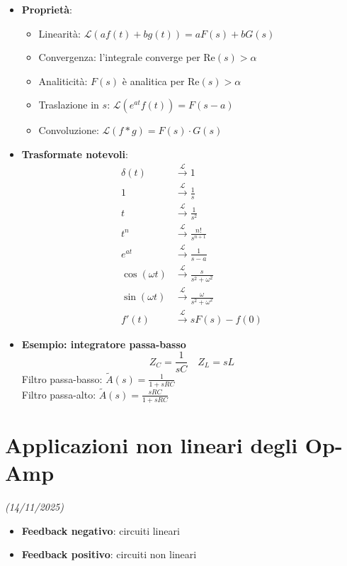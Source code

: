 \documentclass[11pt,a4paper]{report}
\begin{document}
\begin{itemize}
    \item \textbf{Proprietà}:
    \begin{itemize}
        \item Linearità: $\mathcal{L}(a f(t) + b g(t)) = a F(s) + b G(s)$
        \item Convergenza: l'integrale converge per $\text{Re}(s) > \alpha$
        \item Analiticità: $F(s)$ è analitica per $\text{Re}(s) > \alpha$
        \item Traslazione in $s$: $\mathcal{L}(e^{at} f(t)) = F(s-a)$
        \item Convoluzione: $\mathcal{L}(f * g) = F(s) \cdot G(s)$
    \end{itemize}
    \item \textbf{Trasformate notevoli}:
    \begin{align*}
        \delta(t) &\xrightarrow{\mathcal{L}} 1 \\
        1 &\xrightarrow{\mathcal{L}} \frac{1}{s} \\
        t &\xrightarrow{\mathcal{L}} \frac{1}{s^2} \\
        t^n &\xrightarrow{\mathcal{L}} \frac{n!}{s^{n+1}} \\
        e^{at} &\xrightarrow{\mathcal{L}} \frac{1}{s-a} \\
        \cos(\omega t) &\xrightarrow{\mathcal{L}} \frac{s}{s^2 + \omega^2} \\
        \sin(\omega t) &\xrightarrow{\mathcal{L}} \frac{\omega}{s^2 + \omega^2} \\
        f'(t) &\xrightarrow{\mathcal{L}} s F(s) - f(0)
    \end{align*}
    
    \item \textbf{Esempio: integratore passa-basso}
    \[
        Z_C = \frac{1}{sC} \quad Z_L = sL
    \]
    Filtro passa-basso: $\tilde{A}(s) = \frac{1}{1 + sRC}$ \\
    Filtro passa-alto: $\tilde{A}(s) = \frac{sRC}{1 + sRC}$
\end{itemize}


\chapter{Applicazioni non lineari degli Op-Amp}
\textit{(14/11/2025)}

\begin{itemize}
    \item \textbf{Feedback negativo}: circuiti lineari
    \item \textbf{Feedback positivo}: circuiti non lineari
\end{itemize}
\end{document}
